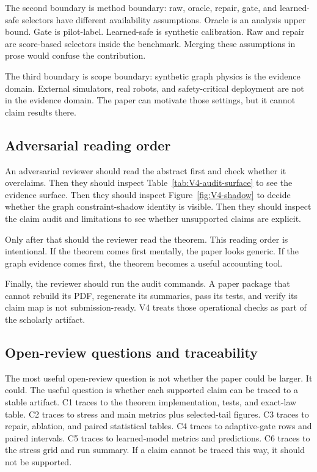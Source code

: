 \documentclass{article}
\begin{document}
The second boundary is method boundary: raw, oracle, repair, gate, and
learned-safe selectors have different availability assumptions.  Oracle is an
analysis upper bound.  Gate is pilot-label.  Learned-safe is synthetic
calibration.  Raw and repair are score-based selectors inside the benchmark.
Merging these assumptions in prose would confuse the contribution.

The third boundary is scope boundary: synthetic graph physics is the evidence
domain.  External simulators, real robots, and safety-critical deployment are
not in the evidence domain.  The paper can motivate those settings, but it
cannot claim results there.

\subsection{Adversarial reading order}

An adversarial reviewer should read the abstract first and check whether it
overclaims.  Then they should inspect Table~\ref{tab:V4-audit-surface} to see
the evidence surface.  Then they should inspect Figure~\ref{fig:V4-shadow} to
decide whether the graph constraint-shadow identity is visible.  Then they
should inspect the claim audit and limitations to see whether unsupported claims
are explicit.

Only after that should the reviewer read the theorem.  This reading order is
intentional.  If the theorem comes first mentally, the paper looks generic.  If
the graph evidence comes first, the theorem becomes a useful accounting tool.

Finally, the reviewer should run the audit commands.  A paper package that
cannot rebuild its PDF, regenerate its summaries, pass its tests, and verify its
claim map is not submission-ready.  V4 treats those operational checks as part
of the scholarly artifact.

\subsection{Open-review questions and traceability}

The most useful open-review question is not whether the paper could be larger.
It could.  The useful question is whether each supported claim can be traced to
a stable artifact.  C1 traces to the theorem implementation, tests, and
exact-law table.  C2 traces to stress and main metrics plus selected-tail
figures.  C3 traces to repair, ablation, and paired statistical tables.  C4
traces to adaptive-gate rows and paired intervals.  C5 traces to learned-model
metrics and predictions.  C6 traces to the stress grid and run summary.  If a
claim cannot be traced this way, it should not be supported.
\end{document}
